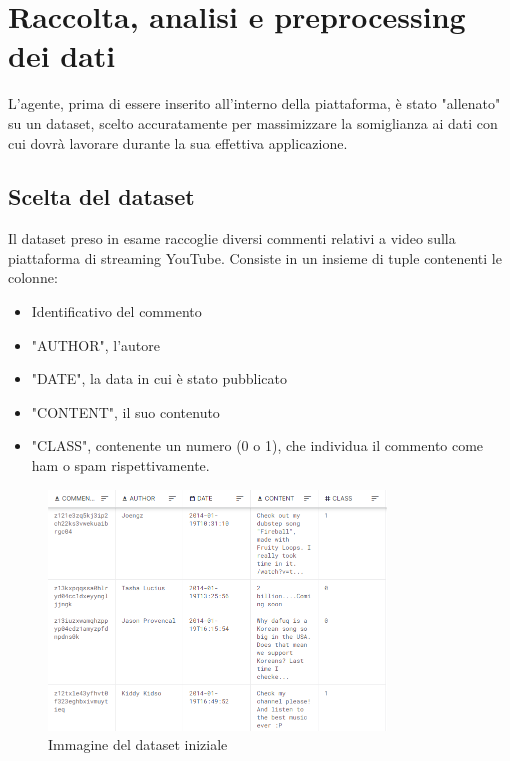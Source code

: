 \documentclass{report}
\begin{document}
    

                        


   
    \chapter{Raccolta, analisi e preprocessing dei dati}
    L'agente, prima di essere inserito all'interno della piattaforma, è stato "allenato" su un dataset, scelto accuratamente per massimizzare la somiglianza ai dati con cui dovrà lavorare 
    durante la sua effettiva applicazione. 
    \section{Scelta del dataset}
    Il dataset preso in esame raccoglie diversi commenti relativi a video sulla piattaforma di streaming YouTube. 
    Consiste in un insieme di tuple contenenti le colonne:
    \begin{itemize}
        \item Identificativo del commento
        \item "AUTHOR", l'autore
        \item "DATE", la data in cui è stato pubblicato
        \item "CONTENT", il suo contenuto
        \item "CLASS", contenente un numero (0 o 1), che individua il commento come ham o spam rispettivamente.
    \end{itemize}
    \begin{figure}
        \centering
        \includegraphics[width = 0.8\textwidth]{immagini/datasetExample.png}
        \caption{Immagine del dataset iniziale}

    \end{figure}
\end{document}
